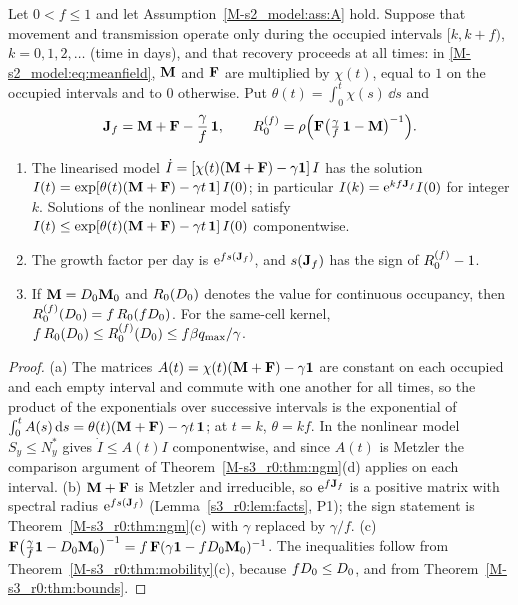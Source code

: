 \begin{proposition}\label{s7_interventions:prop:duty}
  Let $0<f\le1$ and let Assumption~\ref{M-s2_model:ass:A} hold. Suppose that movement and transmission operate
  only during the occupied intervals $[k,k+f)$, $k=0,1,2,\dots$ (time in days), and that recovery proceeds at all
  times: in \eqref{M-s2_model:eq:meanfield}, $\mathbf{M}$ and $\mathbf{F}$ are multiplied by $\chi(t)$, equal to $1$ on the
  occupied intervals and to $0$ otherwise. Put $\theta(t)=\int_0^t\chi(s)\,\dd s$ and
  \begin{equation}\label{s7_interventions:eq:dutydetail}
    \mathbf{J}_f=\mathbf{M}+\mathbf{F}-\frac{\gamma}{f}\,\mathbf{1},\qquad R_0^{(f)}=\rho\Bigl(\mathbf{F}\bigl(\tfrac{\gamma}{f}\,\mathbf{1}-\mathbf{M}\bigr)^{-1}\Bigr).
  \end{equation}
  \begin{enumerate}
    \item[(a)] The linearised model $\dot I=[\chi(t)(\mathbf{M}+\mathbf{F})-\gamma\mathbf{1}]\,I$ has the solution
      $I(t)=\exp[\theta(t)(\mathbf{M}+\mathbf{F})-\gamma t\,\mathbf{1}]\,I(0)$; in particular $I(k)=\mathrm{e}^{kf\mathbf{J}_f}I(0)$ for integer $k$.
      Solutions of the nonlinear model satisfy $I(t)\le\exp[\theta(t)(\mathbf{M}+\mathbf{F})-\gamma t\,\mathbf{1}]\,I(0)$ componentwise.
    \item[(b)] The growth factor per day is $\mathrm{e}^{fs(\mathbf{J}_f)}$, and $s(\mathbf{J}_f)$ has the sign of $R_0^{(f)}-1$.
    \item[(c)] If $\mathbf{M}=D_0\mathbf{M}_0$ and $R_0(D_0)$ denotes the value for continuous occupancy, then
      $R_0^{(f)}(D_0)=f\,R_0(fD_0)$. For the same-cell kernel,
      $f\,R_0(D_0)\le R_0^{(f)}(D_0)\le f\beta q_{\max}/\gamma$.
  \end{enumerate}
\end{proposition}
\begin{proof}
  (a) The matrices $A(t)=\chi(t)(\mathbf{M}+\mathbf{F})-\gamma\mathbf{1}$ are constant on each occupied and each empty interval and
  commute with one another for all times, so the product of the exponentials over successive intervals is the
  exponential of $\int_0^tA(s)\,\mathrm{d} s=\theta(t)(\mathbf{M}+\mathbf{F})-\gamma t\,\mathbf{1}$; at $t=k$, $\theta=kf$. In the nonlinear
  model $S_y\le N^*_y$ gives $\dot I\le A(t)I$ componentwise, and since $A(t)$ is Metzler the comparison
  argument of Theorem~\ref{M-s3_r0:thm:ngm}(d) applies on each interval.
  (b) $\mathbf{M}+\mathbf{F}$ is Metzler and irreducible, so $\mathrm{e}^{f\mathbf{J}_f}$ is a positive matrix with spectral radius
  $\mathrm{e}^{fs(\mathbf{J}_f)}$ (Lemma~\ref{s3_r0:lem:facts}, P1); the sign statement is Theorem~\ref{M-s3_r0:thm:ngm}(c) with
  $\gamma$ replaced by $\gamma/f$.
  (c) $\mathbf{F}\bigl(\tfrac{\gamma}{f}\mathbf{1}-D_0\mathbf{M}_0\bigr)^{-1}=f\,\mathbf{F}(\gamma\mathbf{1}-fD_0\mathbf{M}_0)^{-1}$. The inequalities follow
  from Theorem~\ref{M-s3_r0:thm:mobility}(c), because $fD_0\le D_0$, and from Theorem~\ref{M-s3_r0:thm:bounds}.
\end{proof}

